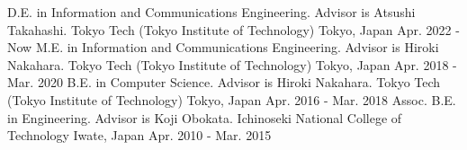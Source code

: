 \begin{cventries}
  \eduentry
    {D.E. in Information and Communications Engineering. Advisor is Atsushi Takahashi.} %
    {Tokyo Tech (Tokyo Institute of Technology)} %
    {Tokyo, Japan} %
    {Apr. 2022 - Now} %
  \eduentry
    {M.E. in Information and Communications Engineering. Advisor is Hiroki Nakahara.} %
    {Tokyo Tech (Tokyo Institute of Technology)} %
    {Tokyo, Japan} %
    {Apr. 2018 - Mar. 2020} %
  \eduentry
    {B.E. in Computer Science. Advisor is Hiroki Nakahara.} %
    {Tokyo Tech (Tokyo Institute of Technology)} %
    {Tokyo, Japan} %
    {Apr. 2016 - Mar. 2018} %
  \eduentry
    {Assoc. B.E. in Engineering. Advisor is Koji Obokata.} %
    {Ichinoseki National College of Technology} %
    {Iwate, Japan} %
    {Apr. 2010 - Mar. 2015} %
\end{cventries}
